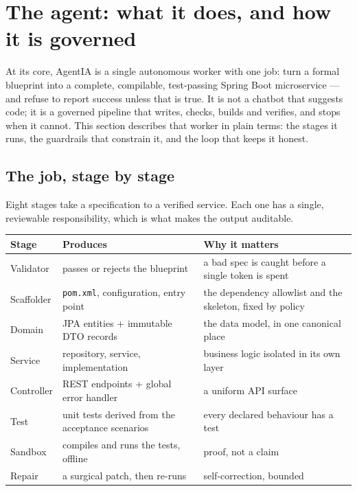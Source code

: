 \documentclass[11pt,a4paper]{article}
\begin{document}
\section{The agent: what it does, and how it is governed}

At its core, AgentIA is a single autonomous worker with one job: turn a formal
blueprint into a complete, compilable, test-passing Spring Boot microservice --- and
refuse to report success unless that is true. It is not a chatbot that suggests code;
it is a governed pipeline that writes, checks, builds and verifies, and stops when it
cannot. This section describes that worker in plain terms: the stages it runs, the
guardrails that constrain it, and the loop that keeps it honest.

\subsection{The job, stage by stage}

Eight stages take a specification to a verified service. Each one has a single,
reviewable responsibility, which is what makes the output auditable.

\begin{center}
\begin{longtable}{@{}p{}p{}p{}@{}}
\toprule
\textbf{Stage} & \textbf{Produces} & \textbf{Why it matters} \\
\midrule
Validator & passes or rejects the blueprint & a bad spec is caught before a single token is spent \\
Scaffolder & \texttt{pom.xml}, configuration, entry point & the dependency allowlist and the skeleton, fixed by policy \\
Domain & JPA entities + immutable DTO records & the data model, in one canonical place \\
Service & repository, service, implementation & business logic isolated in its own layer \\
Controller & REST endpoints + global error handler & a uniform API surface \\
Test & unit tests derived from the acceptance scenarios & every declared behaviour has a test \\
Sandbox & compiles and runs the tests, offline & proof, not a claim \\
Repair & a surgical patch, then re-runs & self-correction, bounded \\
\bottomrule
\end{longtable}
\end{center}
\end{document}
